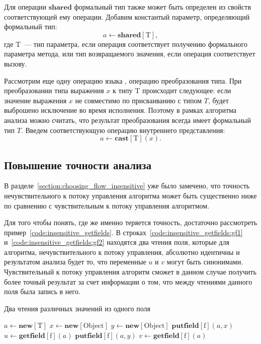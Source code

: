 \documentclass[14pt,titlepage,draft]{extarticle}
\newcommand{\java}{\eng{Java}\xspace}
\newcommand{\type}[1]{\mathrm{#1}}
\newcommand{\field}[1]{\mathrm{#1}}
\newcommand{\op}[1]{\mathbf{#1}}
\begin{document}
    Для операции $\op{shared}$ формальный тип также может быть определен из
    свойств соответствующей ему \java операции.
    Добавим константый параметр, определяющий формальный тип:
    \[a \gets \op{shared}[\type{T}],\]
    где $\type{T}$~--- тип параметра, если операция соответствует
    получению формального параметра метода, или тип возвращаемого значения,
    если операция соответствует вызову.

    Рассмотрим еще одну операцию языка \java, операцию преобразования типа. При
    преобразовании типа выражения $x$ к типу $\type{T}$ происходит следующее:
    если значение выражения $x$ не совместимо по присваиванию с типом $T$,
    будет выброшено исключение во время исполнения.
    Поэтому в рамках алгоритма анализа можно считать, что результат
    преобразования всегда имеет формальный тип $T$.
    Введем соответствующую операцию внутреннего представления:
    \[ a \gets \op{cast}[\type{T}](x). \]

  \subsection{Повышение точности анализа}
    \label{section:increase_accuracy}

    В разделе~\ref{section:choosing_flow_insensitive} уже было замечено, что
    точность нечувствительного к потоку управления алгоритма может быть
    существенно ниже по сравнению с чувствительным к потоку управления
    алгоритмом.

    Для того чтобы понять, где же именно теряется точность, достаточно
    рассмотреть пример~\ref{code:insensitive_getfields}. В
    строках~\ref{code:insensitive_getfields:gf1}
    и~\ref{code:insensitive_getfields:gf2} находятся два чтения поля, которые
    для алгоритма, нечувствительного к потоку управления, абсолютно идентичны и
    результатом анализа будет то, что переменные $u$ и $v$ могут быть
    синонимами. Чувствительный к потоку управления алгоритм сможет в данном
    случае получить более точный результат за счет информации о том, что между
    чтениями данного поля была запись в него.

    \begin{algorithm}
      \caption{Два чтения различных значений из одного поля}
      \label{code:insensitive_getfields}
      \begin{algorithmic}[1]
        \State $a \gets \op{new}[\type{T}]$
        \State $x \gets \op{new}[\type{Object}]$
        \State $y \gets \op{new}[\type{Object}]$
        \State $\op{putfield}[\field{f}](a, x)$
        \State $u \gets \op{getfield}[\field{f}](a)$
          \label{code:insensitive_getfields:gf1}
        \State $\op{putfield}[\field{f}](a, y)$
        \State $v \gets \op{getfield}[\field{f}](a)$
          \label{code:insensitive_getfields:gf2}
      \end{algorithmic}
    \end{algorithm}
\end{document}

